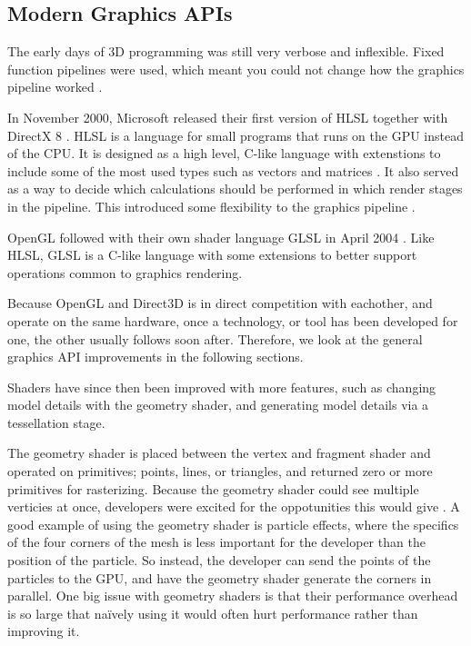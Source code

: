 \subsection{Modern Graphics \acs{API}s}

The early days of 3D programming was still very verbose and inflexible. 
Fixed function pipelines were used, which meant you could not change how the graphics pipeline worked \cite{davidovic2014fixedfunction}.

In November 2000, Microsoft released their first version of \gls{HLSL}  together with DirectX 8 \cite{wikipedia????directx}.
\Gls{HLSL} is a language for small programs that runs on the \gls{GPU} instead of the \gls{CPU}.
It is designed as a high level, C-like language with extenstions to include some of the most used types such as vectors and matrices \cite{microsoft????hlsl}.
It also served as a way to decide which calculations should be performed in which render stages in the pipeline.
This introduced some flexibility to the graphics pipeline .

OpenGL followed with their own shader language \gls{GLSL} in April 2004 \cite{wikipedia????opengl}. 
Like \gls{HLSL}, \gls{GLSL} is a C-like language with some extensions to better support operations common to graphics rendering.

\vspace{1em}

\noindent
Because OpenGL and Direct3D is in direct competition with eachother, and operate on the same hardware, once a technology, or tool has been developed for one, the other usually follows soon after.
Therefore, we look at the general graphics \gls{API} improvements in the following sections.

\vspace{1em}

\noindent
Shaders have since then been improved with more features, such as changing model details with the geometry shader, and generating model details via a tessellation stage.

The geometry shader is placed between the vertex and fragment shader and operated on primitives; points, lines, or triangles, and returned zero or more primitives for rasterizing.
Because the geometry shader could see multiple verticies at once, developers were excited for the oppotunities this would give \cite{kronos????geometry, microsoft????geometry}.
A good example of using the geometry shader is particle effects, where the specifics of the four corners of the mesh is less important for the developer than the position of the particle.
So instead, the developer can send the points of the particles to the \gls{GPU}, and have the geometry shader generate the corners in parallel.
One big issue with geometry shaders is that their performance overhead is so large that naïvely using it would often hurt performance rather than improving it.

